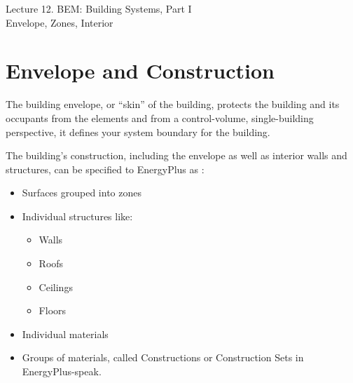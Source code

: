 \documentclass[10pt]{article}
\begin{document}
   \noindent
   \begin{center}

   \hrulefill
   
   \vspace{5pt}
   
   \vspace{0pt}
   
   {\Large \hfill  Lecture 12. BEM: Building Systems, Part I\\ \hfill {\large Envelope, Zones, Interior}}
   \vspace{5pt}
   
  
   \hrulefill
   \end{center}

   {}



\section{Envelope and Construction}

The building envelope, or ``skin'' of the building, protects the building and its occupants from the elements and from a control-volume, single-building perspective, it defines your system boundary for the building. 

The building's construction, including the envelope as well as interior walls and structures, can be specified to EnergyPlus as \cite{EPcourseteaching}:

\vspace{-6pt}
\begin{itemize}
    \setlength{\itemsep}{0pt}%
    \setlength{\parskip}{0pt}%
    \item Surfaces grouped into zones
    \item Individual structures like:
        \begin{itemize}
            \setlength{\itemsep}{0pt}%
            \setlength{\parskip}{0pt}%
            \item Walls
            \item Roofs
            \item Ceilings
            \item Floors
        \end{itemize}
        \item Individual materials
        \item Groups of materials, called Constructions or Construction Sets in EnergyPlus-speak.
\end{itemize}
\vspace{-6pt}
\end{document}

